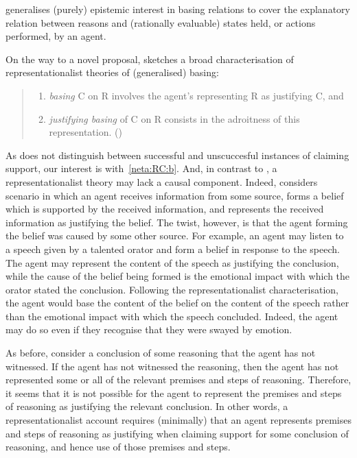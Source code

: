 \begin{note}[Representationalism]
  \citeauthor{Neta:2019aa} generalises (purely) epistemic interest in basing relations to cover the explanatory relation between reasons and (rationally evaluable) states held, or actions performed, by an agent.

  On the way to a novel proposal, \citeauthor{Neta:2019aa} sketches a broad characterisation of representationalist theories of (generalised) basing:
  \begin{quote}
    \begin{enumerate}[label=(R\arabic*), ref=(R\arabic*)]
    \item\label{neta:RC:b} \emph{basing} C on R involves the agent's representing R as justifying C, and
    \item\label{neta:RC:jb} \emph{justifying basing} of C on R consists in the adroitness of this representation.\nolinebreak
          \mbox{}\hfill\mbox{(\Citeyear[192]{Neta:2019aa})}
    \end{enumerate}
  \end{quote}
  As \ESU{} does not distinguish between successful and unscuccesful instances of claiming support, our interest is with~\ref{neta:RC:b}.
  And, in contrast to \citeauthor{Moser:1989tv}, a representationalist theory may lack a causal component.
  Indeed, \citeauthor{Neta:2019aa} considers scenario in which an agent receives information from some source, forms a belief which is supported by the received information, and represents the received information as justifying the belief.
  The twist, however, is that the agent forming the belief was caused by some other source.
  For example, an agent may listen to a speech given by a talented orator and form a belief in response to the speech.
  The agent may represent the content of the speech as justifying the conclusion, while the cause of the belief being formed is the emotional impact with which the orator stated the conclusion.
  Following the representationalist characterisation, the agent would base the content of the belief on the content of the speech rather than the emotional impact with which the speech concluded.
  Indeed, the agent may do so even if they recognise that they were swayed by emotion.

  As before, consider a conclusion of some reasoning that the agent has not witnessed.
  If the agent has not witnessed the reasoning, then the agent has not represented some or all of the relevant premises and steps of reasoning.
  Therefore, it seems that it is not possible for the agent to represent the premises and steps of reasoning as justifying the relevant conclusion.
  In other words, a representationalist account requires (minimally) that an agent represents premises and steps of reasoning as justifying when claiming support for some conclusion of reasoning, and hence use of those premises and steps.


\end{note}
